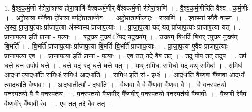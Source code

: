 \documentclass[17pt]{extarticle}
\begin{document}
1. वै॒श्व॒क॒र्म॒णी र॑होरा॒त्राण्य॑ होरा॒त्राणि॑ वैश्वकर्म॒णीर् वै᳚श्वकर्म॒णी र॑होरा॒त्राणि॑ । . वै॒श्व॒क॒र्म॒णीरिति॑ वैश्व - क॒र्म॒णीः । . अ॒हो॒रा॒त्रा ण्ये॒वैवा हो॑रा॒त्रा ण्य॑होरा॒त्राण्ये॒व । . अ॒हो॒रा॒त्राणीत्य॑हः - रा॒त्राणि॑ । . ए॒वास्या᳚ स्यै॒वै वास्य॑ । . अ॒स्य॒ प्रा॒जा॒प॒त्याः प्रा॑जाप॒त्या अ॑स्यास्य प्राजाप॒त्याः । . प्रा॒जा॒प॒त्या यद् यत् प्रा॑जाप॒त्याः प्रा॑जाप॒त्या यत् । . प्रा॒जा॒प॒त्या इति॑ प्राजा - प॒त्याः । . यदुख्य॒ मुख्यं॒ ॅयद् यदुख्य᳚म् । . उख्य॑म् बि॒भर्ति॑ बि॒भर् त्युख्य॒ मुख्य॑म् बि॒भर्ति॑ । . बि॒भर्ति॑ प्राजाप॒त्याः प्रा॑जाप॒त्या बि॒भर्ति॑ बि॒भर्ति॑ प्राजाप॒त्याः । . प्रा॒जा॒प॒त्या ए॒वैव प्रा॑जाप॒त्याः प्रा॑जाप॒त्या ए॒व । . प्रा॒जा॒प॒त्या इति॑ प्राजा - प॒त्याः । . ए॒व तत् तदे॒ वैव तत् । . तदु पोप॒ तत् तदुप॑ । . उप॑ धत्ते धत्त॒ उपोप॑ धत्ते । . ध॒त्ते॒ यद् यद् ध॑त्ते धत्ते॒ यत् । . यथ् स॒मिधः॑ स॒मिधो॒ यद् यथ् स॒मिधः॑ । . स॒मिध॑ आ॒दधा᳚ त्या॒दधा॑ति स॒मिधः॑ स॒मिध॑ आ॒दधा॑ति । . स॒मिध॒ इति॑ सं - इधः॑ । . आ॒दधा॑ति वैष्ण॒वा वै᳚ष्ण॒वा आ॒दधा᳚ त्या॒दधा॑ति वैष्ण॒वाः । . आ॒दधा॒तीत्या᳚ - दधा॑ति । . वै॒ष्ण॒वा वै वै वै᳚ष्ण॒वा वै᳚ष्ण॒वा वै । . वै वन॒स्पत॑यो॒ वन॒स्पत॑यो॒ वै वै वन॒स्पत॑यः । . वन॒स्पत॑यो वैष्ण॒वीर् वै᳚ष्ण॒वीर् वन॒स्पत॑यो॒ वन॒स्पत॑यो वैष्ण॒वीः । . वै॒ष्ण॒वी रे॒वैव वै᳚ष्ण॒वीर् वै᳚ष्ण॒वी रे॒व । . ए॒व तत् तदे॒ वैव तत् । \newline
\end{document}
